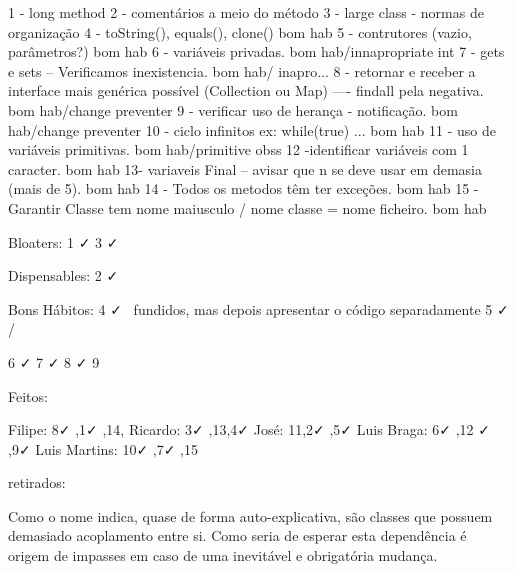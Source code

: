 1 - long method 
2 - comentários a meio do método
3 - large class
 - normas de organização
 4 - toString(), equals(), clone()         bom hab
 5 - contrutores (vazio, parâmetros?)      bom hab
 6 - variáveis privadas.                    bom hab/innapropriate int
 7 - gets e sets -- Verificamos inexistencia.  bom hab/ inapro...
 8 - retornar e receber a interface mais genérica possível (Collection ou Map) ---- findall pela negativa.          bom hab/change preventer
 9 - verificar uso de herança - notificação.    bom hab/change preventer
10 - ciclo infinitos ex: while(true) ...        bom hab
11 - uso de variáveis primitivas.               bom hab/primitive obss
12	-identificar variáveis com 1 caracter.      bom hab
13- variaveis Final -- avisar que n se deve usar em demasia (mais de 5).  bom hab
14 - Todos os metodos têm ter exceções.       bom hab
15 - Garantir Classe tem nome maiusculo / nome classe = nome ficheiro. bom hab


Bloaters:
1     ✓ 
3     ✓ 

Dispensables:
2     ✓ 


Bons Hábitos:
4      ✓   \
              fundidos, mas depois apresentar o código separadamente
5       ✓  / 

6       ✓ 
7       ✓ 
8       ✓ 
9      



Feitos:

Filipe: 8✓ ,1✓ ,14,
Ricardo: 3✓ ,13,4✓ 
José: 11,2✓ ,5✓ 
Luis Braga: 6✓ ,12 ✓ ,9✓ 
Luis Martins: 10✓ ,7✓ ,15





































retirados:

\par Como o nome indica, quase de forma auto-explicativa, são classes que possuem demasiado acoplamento entre si. Como seria de esperar esta dependência é origem de impasses em caso de uma inevitável e obrigatória mudança.







